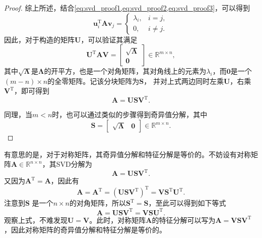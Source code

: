 \begin{proof}
    综上所述，结合\cref{eq:svd_proof1,eq:svd_proof2,eq:svd_proof3}，可以得到
    \[
        \bm{u}_i^{\mathrm{T}} \mathbf{A} \bm{v}_j =
        \begin{cases}
            \lambda_i, & i = j,    \\
            0,         & i \neq j.
        \end{cases}
    \]
    因此，对于构造的矩阵\( \mathbf{U} \)，可以验证其满足
    \[
        \mathbf{U}^{\mathrm{T}} \mathbf{A} \mathbf{V} =
        \begin{bmatrix}
            \sqrt{\mathbf{\Lambda}} \\
            \mathbf{0}
        \end{bmatrix} \in \mathbb{R}^{m \times n},
    \]
    其中\( \sqrt{\mathbf{\Lambda}} \)是\( \mathbf{\Lambda} \)的开平方，也是一个对角矩阵，其对角线上的元素为\( \lambda_i \)，而\( \mathbf{0} \)是一个\( (m - n) \times n \)的全零矩阵。记该分块矩阵为\( \mathbf{S} \)， 并对上式两边同时左乘\( \mathbf{U} \)，右乘\( \mathbf{V}^{\mathrm{T}} \)，即可得到
    \[
        \mathbf{A} = \mathbf{U} \mathbf{S} \mathbf{V}^{\mathrm{T}}.
    \]

    同理，当\( m < n \)时，也可以通过类似的步骤得到奇异值分解，其中
    \[
        \mathbf{S} =
        \begin{bmatrix}
            \sqrt{\mathbf{\Lambda}} & \mathbf{0}
        \end{bmatrix} \in \mathbb{R}^{m \times n}.
    \]
\end{proof}

有意思的是，对于对称矩阵，其奇异值分解和特征分解是等价的。不妨设有对称矩阵\( \mathbf{A} \in \mathbb{R}^{n \times n} \)，其SVD分解为
\[
    \mathbf{A} = \mathbf{U} \mathbf{S} \mathbf{V}^{\mathrm{T}}.
\]
又因为\( \mathbf{A}^{\mathrm{T}} = \mathbf{A} \)，因此有
\[
    \mathbf{A} = \mathbf{A}^{\mathrm{T}}= \left( \mathbf{U} \mathbf{S} \mathbf{V}^{\mathrm{T}} \right)^{\mathrm{T}} = \mathbf{V} \mathbf{S}^{\mathrm{T}} \mathbf{U}^{\mathrm{T}}.
\]
注意到\( \mathbf{S} \) 是一个\( n \times n \)的对角矩阵，所以\( \mathbf{S}^{\mathrm{T}}  = \mathbf{S} \)，至此可以得到如下等式
\[
    \mathbf{A} = \mathbf{U} \mathbf{S} \mathbf{V}^{\mathrm{T}} = \mathbf{V} \mathbf{S} \mathbf{U}^{\mathrm{T}}.
\]
观察上式，不难发现\( \mathbf{U} =  \mathbf{V} \)。此时，对称矩阵\( \mathbf{A} \)的特征分解可以写为\( \mathbf{A} = \mathbf{V} \mathbf{S} \mathbf{V}^{\mathrm{T}} \)，因此对称矩阵的奇异值分解和特征分解是等价的。

